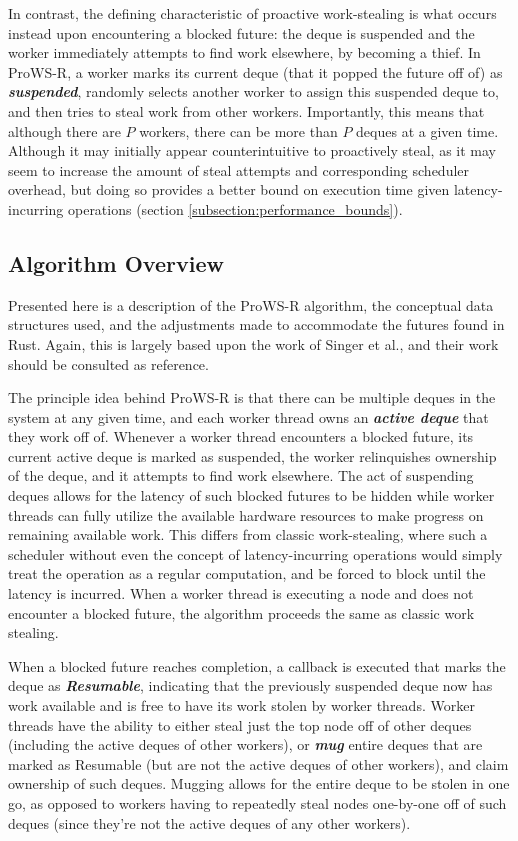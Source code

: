 \documentclass[bsc,frontabs,singlespacing,parskip,deptreport,normalheadings]{infthesis}
\begin{document}
In contrast, the defining characteristic of proactive work-stealing is what
occurs instead upon encountering a blocked future: the deque is suspended and
the worker immediately attempts to find work elsewhere, by becoming a thief. In
ProWS-R, a worker marks its current deque (that it popped the future off of) as
\textbf{\textit{suspended}}, randomly selects another worker to assign this
suspended deque to, and then tries to steal work from other workers.
Importantly, this means that although there are \(P\) workers, there can be more
than \(P\) deques at a given time. Although it may initially appear
counterintuitive to proactively steal, as it may seem to increase the amount of
steal attempts and corresponding scheduler overhead, but doing so provides a
better bound on execution time given latency-incurring operations (section
\ref{subsection:performance_bounds}).

\subsection{Algorithm Overview}
\label{subsection:the_algorithm_in_detail}

Presented here is a description of the ProWS-R algorithm, the conceptual data
structures used, and the adjustments made to accommodate the futures found in
Rust. Again, this is largely based upon the work of Singer et al., and their
work should be consulted as reference.

The principle idea behind ProWS-R is that there can be multiple deques in the
system at any given time, and each worker thread owns an \textbf{\textit{active
deque}} that they work off of. Whenever a worker thread encounters a blocked
future, its current active deque is marked as suspended, the worker relinquishes
ownership of the deque, and it attempts to find work elsewhere. The act of
suspending deques allows for the latency of such blocked futures to be hidden
while worker threads can fully utilize the available hardware resources to make
progress on remaining available work. This differs from classic work-stealing,
where such a scheduler without even the concept of latency-incurring operations
would simply treat the operation as a regular computation, and be forced to
block until the latency is incurred. When a worker thread is executing a node
and does not encounter a blocked future, the algorithm proceeds the same as
classic work stealing.

When a blocked future reaches completion, a callback is executed that marks the
deque as \textbf{\textit{Resumable}}, indicating that the previously suspended
deque now has work available and is free to have its work stolen by worker
threads. Worker threads have the ability to either steal just the top node off
of other deques (including the active deques of other workers), or
\textit{\textbf{mug}} entire deques that are marked as Resumable (but are not
the active deques of other workers), and claim ownership of such deques. Mugging
allows for the entire deque to be stolen in one go, as opposed to workers having
to repeatedly steal nodes one-by-one off of such deques (since they're not the
active deques of any other workers). 
\end{document}
